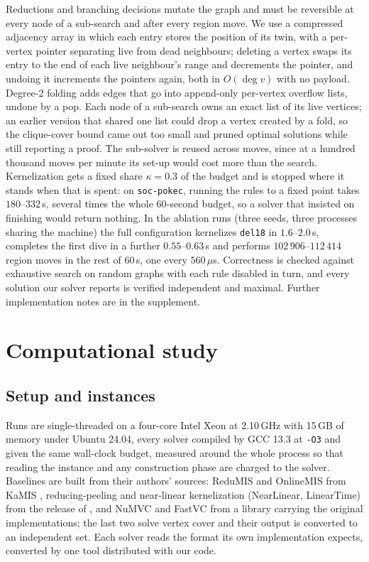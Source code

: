 \documentclass[pdflatex,sn-mathphys-num]{sn-jnl}
\theoremstyle{thmstyleone}%
\theoremstyle{thmstyletwo}%
\begin{document}
Reductions and branching decisions mutate the graph and must be reversible at every
node of a sub-search and after every region move. We use a compressed adjacency
array in which each entry stores the position of its twin, with a per-vertex pointer
separating live from dead neighbours; deleting a vertex swaps its entry to the end of
each live neighbour's range and decrements the pointer, and undoing it increments the
pointers again, both in $O(\deg v)$ with no payload. Degree-2 folding adds edges that
go into append-only per-vertex overflow lists, undone by a pop. Each node of a
sub-search owns an exact list of its live vertices; an earlier version that shared one
list could drop a vertex created by a fold, so the clique-cover bound came out too
small and pruned optimal solutions while still reporting a proof. The sub-solver is
reused across moves, since at a hundred thousand moves per minute its set-up would
cost more than the search. Kernelization gets a fixed share $\kappa=0.3$ of the
budget and is stopped where it stands when that is spent: on \texttt{soc-pokec},
running the rules to a fixed point takes $180$--$332$\,s, several times the whole
60-second budget, so a solver that insisted on finishing would return nothing. In the
ablation runs (three seeds, three processes sharing the machine) the full
configuration kernelizes \texttt{del18} in $1.6$--$2.0$\,s, completes the first dive in
a further $0.55$--$0.63$\,s and performs $102\,906$--$112\,414$ region moves in the
rest of 60\,s, one every $560\,\mu$s. Correctness is checked against exhaustive search
on random graphs with each rule disabled in turn, and every solution our solver reports
is verified independent and maximal. Further implementation notes are in the
supplement.
\section{Computational study}
\label{sec:experiments}

\subsection{Setup and instances}
\label{sec:setup-machine}

Runs are single-threaded on a four-core Intel Xeon at 2.10\,GHz with 15\,GB of
memory under Ubuntu 24.04, every solver compiled by GCC 13.3 at \texttt{-O3} and
given the same wall-clock budget, measured around the whole process so that reading
the instance and any construction phase are charged to the solver. Baselines are
built from their authors' sources: ReduMIS and OnlineMIS from KaMIS
\citep{lamm2017,dahlum2016}, reducing-peeling and near-linear kernelization (NearLinear,
LinearTime) from the release of \citet{chang2017}, and NuMVC and FastVC from a library
carrying the original implementations; the last two solve vertex cover and their
output is converted to an independent set. Each solver reads the format its own
implementation expects, converted by one tool distributed with our code.
\end{document}
